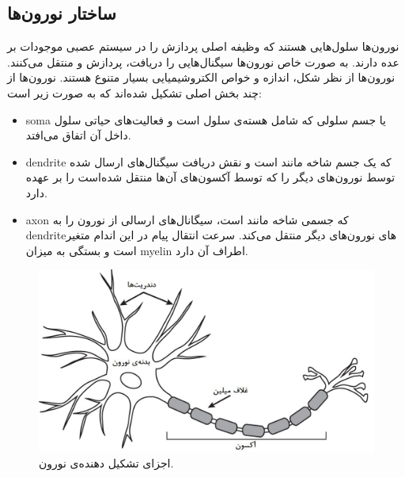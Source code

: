 \documentclass[12pt]{report}
\begin{document}
	\subsection{ساختار نورون‌ها}
	
	نورون‌ها سلول‌هایی هستند که وظیفه اصلی پردازش را در سیستم عصبی موجودات بر عده دارند. به صورت خاص نورون‌ها سیگنال‌هایی را دریافت، پردازش و منتقل می‌کنند. نورون‌ها از نظر شکل، اندازه و خواص الکتروشیمیایی بسیار متنوع هستند. نورون‌ها از چند بخش اصلی تشکیل شده‌اند که به صورت زیر است:
	\begin{itemize}
		\item \gls{soma} یا جسم سلولی که شامل هسته‌ی سلول است و فعالیت‌های حیاتی سلول داخل آن اتفاق می‌افتد.
		\item \gls{dendrite} که یک جسم شاخه مانند است و نقش دریافت سیگنال‌های ارسال شده توسط نورون‌های دیگر را که توسط آکسون‌های آن‌ها منتقل شده‌است را بر عهده دارد.
		\item \gls{axon} که جسمی شاخه مانند است، سیگانال‌های ارسالی از نورون را به \gls{dendrite}‌های نورون‌های دیگر منتقل می‌کند. سرعت انتقال پیام‌‌ در این اندام متغیر است و بستگی به میزان \gls{myelin} اطراف آن دارد.
	\end{itemize}
	
	\begin{figure}[H]
		\centering
		\includegraphics[width=0.7\linewidth]{neuron.jpg}
		\caption[NS]{
			اجزای تشکیل دهنده‌ی نورون\footnotemark.
		}
		\label{fig:neuron}
	\end{figure}
	
	
\end{document}
